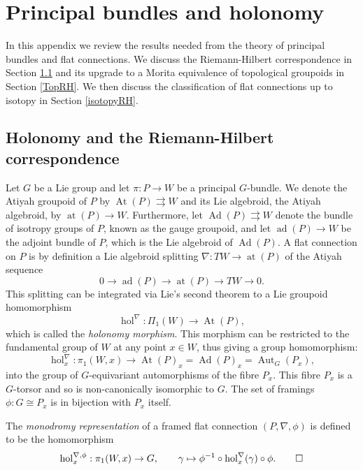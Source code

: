 \documentclass[10pt]{amsart}
\newcommand{\hol}{{\operatorname{hol}}}
\DeclareMathOperator{\Aut}{Aut}
\DeclareMathOperator{\At}{At}
\DeclareMathOperator{\Ad}{Ad}
\DeclareMathOperator{\at}{at}
\DeclareMathOperator{\ad}{ad}
\numberwithin{theoremalpha}{section}
\numberwithin{equation}{section}
\numberwithin{definition}{section}
\numberwithin{theorem}{section}
\numberwithin{proposition}{section}
\numberwithin{lemma}{section}
\numberwithin{example}{section}
\numberwithin{remark}{section}
\numberwithin{corollary}{section}
\numberwithin{question}{section}
\numberwithin{problem}{section}
\numberwithin{assumption}{section}
\theoremstyle{named}
\numberwithin{equation}{section}
\begin{document}
\section{Principal bundles and holonomy}\label{sec:principal}

In this appendix we review the results needed from the theory of principal bundles and flat connections. We discuss the Riemann-Hilbert correspondence in Section \ref{holonomymap} and its upgrade to a Morita equivalence of topological groupoids in Section \ref{TopRH}. We then discuss the classification of flat connections up to isotopy in Section \ref{isotopyRH}. 

\subsection{Holonomy and the Riemann-Hilbert correspondence} \label{holonomymap}

Let $G$ be a Lie group and let $\pi : P \to W$ be a principal $G$-bundle. We denote the Atiyah groupoid of $P$ by $\At(P) \rightrightarrows W$ and its Lie algebroid, the Atiyah algebroid, by $\at(P) \to W$. Furthermore, let $\Ad(P) \rightrightarrows W$ denote the bundle of isotropy groups of $P$, known as the gauge groupoid, and let $\ad(P) \to W$ be the adjoint bundle of $P$, which is the Lie algebroid of $\Ad(P)$. A flat connection on $P$ is by definition a Lie algebroid splitting $\nabla : TW \to \at(P)$ of the Atiyah sequence 
\[ 0 \to \ad(P) \to \at(P) \to TW \to 0. \]
This splitting can be integrated via Lie's second theorem \cite{mackenzie2000integration, moerdijk2002integrability} to a Lie groupoid homomorphism 
\[ \hol^{\nabla} : \Pi_{1}(W) \to \At(P), \]
which is called the \emph{holonomy morphism}. This morphism can be restricted to the fundamental group of $W$ at any point $x \in W$, thus giving a group homomorphism: 
\[ \hol_{x}^{\nabla} : \pi_{1}(W,x) \to \At(P)_{x} = \Ad(P)_{x} = \Aut_{G}(P_{x}), \]
into the group of $G$-equivariant automorphisms of the fibre $P_{x}$. This fibre $P_{x}$ is a $G$-torsor and so is non-canonically isomorphic to $G$. The set of framings $\phi: G \cong P_{x}$ is in bijection with $P_{x}$ itself.
\begin{definition}
The \emph{monodromy representation} of a framed flat connection $(P, \nabla, \phi)$ is defined to be the homomorphism 
\[ \hol_{x}^{\nabla, \phi} : \pi_{1}(W, x) \to G, \qquad \gamma \mapsto \phi^{-1} \circ \hol_{x}^{\nabla} (\gamma) \circ \phi. \hfill \qedhere \]
\end{definition}
\end{document}
